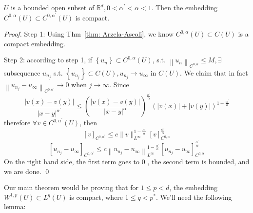 \begin{theorem}
\label{thm: Compactness of embedding Holder}
$U$ is a bounded open subset of $\mathbb{R}^{d}, 0<\alpha^{\prime}<\alpha<1$. Then the embedding $C^{0, \alpha}(U) \subset C^{0, \alpha^{\prime}}(U)$ is compact.
\end{theorem}
\begin{proof}

    Step 1: Using Thm~\ref{thm: Arzela-Ascoli}, we know $C^{0,\alpha}(U)\subset C(U)$ is a compact embedding. 

    \noindent Step 2: according to step 1, if $\left\{u_{n}\right\} \subset C^{0, \alpha}(U)$, s.t. $\left\|u_{n}\right\|_{C^{0, \alpha}} \leq M, \exists$ subsequence $u_{n_{j}}$ s.t. $\left\{u_{n_{j}}\right\} \subset C(U), u_{n_{j}} \rightarrow u_{\infty}$ in $C(U)$. We claim that in fact $\left\|u_{n_{j}}-u_{\infty}\right\|_{C^{0, \alpha^{\prime}}} \rightarrow 0$ when $j \rightarrow \infty$.
    Since
    $$
    \frac{|v(x)-v(y)|}{|x-y|^{\alpha^{\prime}}} \leq\left(\frac{|v(x)-v(y)|}{|x-y|^{\alpha}}\right)^{\frac{\alpha^{\prime}}{\alpha}}(|v(x)|+|v(y)|)^{1-\frac{\alpha^{\prime}}{\alpha}}
    $$
    therefore $\forall v \in C^{0, \alpha^{\prime}}(U)$,
    then
    $$
    [v]_{C^{0, \alpha^{\prime}}} \leq c\|v\|_{L^{\infty}}^{1-\frac{\alpha^{\prime}}{\alpha}}[v]_{C^{0, \alpha}}^{\frac{\alpha^{\prime}}{\alpha}}
    $$
    $$
    \left[u_{n_{j}}-u_{\infty}\right]_{C^{0, \alpha^{\prime}}} \leq c\left\|u_{n_{j}}-u_{\infty}\right\|_{L^{\infty}}^{1-\frac{\alpha^{\prime}}{\alpha}}\left[u_{n_{j}}-u_{\infty}\right]_{C^{0, \alpha}}^{\frac{\alpha^{\prime}}{\alpha}}
    $$
    On the right hand side, the first term goes to 0 , the second term is bounded, and we are done.
    \qed
\end{proof}

Our main theorem would be proving that for $1 \leq p<d$, the embedding $W^{1, p}(U) \subset L^{q}(U)$ is compact, where $1 \leq q<p^{*}$. We'll need the following lemma:


